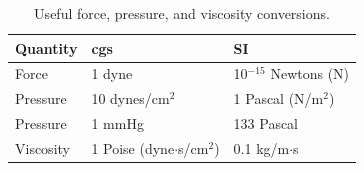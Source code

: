 \begin{table}[h]
\begin{center}
\begin{tabular}{|l|l|l|}
\hline
Quantity & cgs & SI \\
\hline
Force & 1 dyne & 10$^{-15}$ Newtons (N) \\
Pressure & 10 dynes/cm$^2$ & 1 Pascal (N/m$^2$) \\
Pressure & 1 mmHg & 133 Pascal \\
Viscosity & 1 Poise (dyne$\cdot$s/cm$^2$)  & 0.1 kg/m$\cdot$s\\
\hline
\end{tabular}
\caption{Useful force, pressure, and viscosity conversions.}
\label{table2-2}
\end{center}
\end{table}

